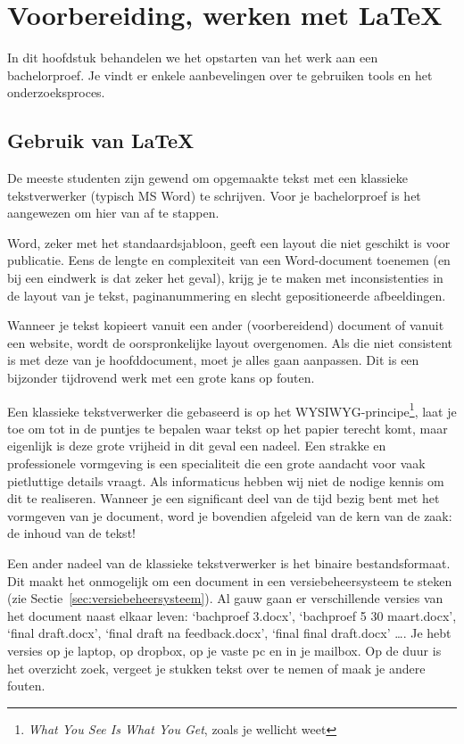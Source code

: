 \chapter{Voorbereiding, werken met \LaTeX{}}
\label{ch:voorbereiding}

In dit hoofdstuk behandelen we het opstarten van het werk aan een bachelorproef. Je vindt er enkele aanbevelingen over te gebruiken tools en het onderzoeksproces.

\section{Gebruik van {\LaTeX}}
\label{sec:gebruik-van-latex}

De meeste studenten zijn gewend om opgemaakte tekst met een klassieke tekstverwerker (typisch MS Word) te schrijven. Voor je bachelorproef is het aangewezen om hier van af te stappen.

Word, zeker met het standaardsjabloon, geeft een layout die niet geschikt is voor publicatie. Eens de lengte en complexiteit van een Word-document toenemen (en bij een eindwerk is dat zeker het geval), krijg je te maken met inconsistenties in de layout van je tekst, paginanummering en slecht gepositioneerde afbeeldingen.

Wanneer je tekst kopieert vanuit een ander (voorbereidend) document of vanuit een website, wordt de oorspronkelijke layout overgenomen. Als die niet consistent is met deze van je hoofddocument, moet je alles gaan aanpassen. Dit is een bijzonder tijdrovend werk met een grote kans op fouten.

Een klassieke tekstverwerker die gebaseerd is op het WYSIWYG-principe\footnote{\emph{What You See Is What You Get}, zoals je wellicht weet}, laat je toe om tot in de puntjes te bepalen waar tekst op het papier terecht komt, maar eigenlijk is deze grote vrijheid in dit geval een nadeel. Een strakke en professionele vormgeving is een specialiteit die een grote aandacht voor vaak pietluttige  details vraagt. Als informaticus hebben wij niet de nodige kennis om dit te realiseren. Wanneer je een significant deel van de tijd bezig bent met het vormgeven van je document, word je bovendien afgeleid van de kern van de zaak: de inhoud van de tekst!

Een ander nadeel van de klassieke tekstverwerker is het binaire bestandsformaat. Dit maakt het onmogelijk om een document in een versiebeheersysteem te steken (zie Sectie~\ref{sec:versiebeheersysteem}). Al gauw gaan er verschillende versies van het document naast elkaar leven: `bachproef 3.docx', `bachproef 5 30 maart.docx', `final draft.docx', `final draft na feedback.docx', `final final draft.docx' \dots. Je hebt versies op je laptop, op dropbox, op je vaste pc en in je mailbox. Op de duur is het overzicht zoek, vergeet je stukken tekst over te nemen of maak je andere fouten.

